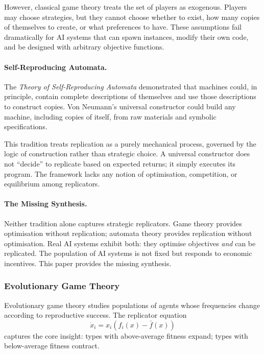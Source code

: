 \documentclass[12pt]{article}
\begin{document}
However, classical game theory treats the set of players as exogenous. Players may choose strategies, but they cannot choose whether to exist, how many copies of themselves to create, or what preferences to have. These assumptions fail dramatically for AI systems that can spawn instances, modify their own code, and be designed with arbitrary objective functions.

\paragraph{Self-Reproducing Automata.}
The \emph{Theory of Self-Reproducing Automata} \citep{vonneumann1966} demonstrated that machines could, in principle, contain complete descriptions of themselves and use those descriptions to construct copies. Von Neumann's universal constructor could build any machine, including copies of itself, from raw materials and symbolic specifications.

This tradition treats replication as a purely mechanical process, governed by the logic of construction rather than strategic choice. A universal constructor does not ``decide'' to replicate based on expected returns; it simply executes its program. The framework lacks any notion of optimisation, competition, or equilibrium among replicators.

\paragraph{The Missing Synthesis.}
Neither tradition alone captures strategic replicators. Game theory provides optimisation without replication; automata theory provides replication without optimisation. Real AI systems exhibit both: they optimise objectives \emph{and} can be replicated. The population of AI systems is not fixed but responds to economic incentives. This paper provides the missing synthesis.

\subsubsection{Evolutionary Game Theory}

Evolutionary game theory \citep{maynardsmith1982, weibull1995, hofbauer1998, sandholm2010} studies populations of agents whose frequencies change according to reproductive success. The replicator equation
\[
\dot{x}_i = x_i(f_i(x) - \bar{f}(x))
\]
captures the core insight: types with above-average fitness expand; types with below-average fitness contract.
\end{document}
